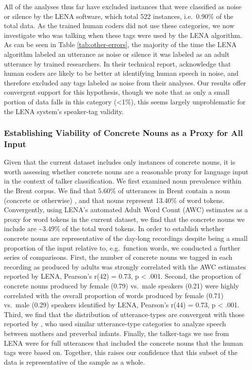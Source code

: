 \documentclass[man,floatsintext]{apa6}
\theoremstyle{definition}
\theoremstyle{definition}
\theoremstyle{definition}
\theoremstyle{remark}
\begin{document}
All of the analyses thus far have excluded instances that were
classified as noise or silence by the LENA software, which total 522
instances, i.e.~0.90\% of the total data. As the trained human coders
did not use these categories, we now investigate who was talking when
these tags were used by the LENA algorithm. As can be seen in Table
\ref{tab:other-errors}, the majority of the time the LENA algorithm
labeled an utterance as noise or silence it was labeled as an adult
utterance by trained researchers. In their technical report,
\citet{Xu2009} acknowledge that human coders are likely to be better at
identifying human speech in noise, and therefore excluded any tags
labeled as noise from their analyses. Our results offer convergent
support for this hypothesis, though we note that as only a small portion
of data falls in this category (\textless1\%), this seems largely
unproblematic for the LENA system's speaker-tag validity.

\hypertarget{establishing-viability-of-concrete-nouns-as-a-proxy-for-all-input}{%
\subsubsection{Establishing Viability of Concrete Nouns as a Proxy for
All
Input}\label{establishing-viability-of-concrete-nouns-as-a-proxy-for-all-input}}

Given that the current dataset includes only instances of concrete
nouns, it is worth assessing whether concrete nouns are a reasonable
proxy for language input in the context of talker classification. We
first examined noun prevalence within the Brent corpus. We find that
5.60\% of utterances in Brent contain a noun (concrete or otherwise)
\citep{Sanchez2019, Brent2001}, and that nouns represent 13.40\% of word
tokens. Convergently, using LENA's automated Adult Word Count (AWC)
estimates as a proxy for word tokens in the current dataset, we find
that the concrete nouns we include are \textasciitilde3.49\% of the
total word tokens. In order to establish whether concrete nouns are
representative of the day-long recordings despite being a small
proportion of the input relative to, e.g.~function words, we conducted a
further series of comparisons. First, the number of concrete nouns we
tagged in each recording as produced by adults was strongly correlated
with the AWC estimates reported by LENA, Pearson's r(42) = 0.73, p
\textless{} .001. Second, the proportion of concrete nouns produced by
female (0.79) vs.~male speakers (0.21) were highly correlated with the
overall proportion of words produced by female (0.71) vs.~male (0.29)
speakers identified by LENA, Pearson's r(44) = 0.73, p \textless{} .001.
Third, we find that the distribution of utterance-types are convergent
with those reported by \citet{Soderstrom2008}, who used similar
utterance-type categories to analyze speech between mothers and
preverbal infants. Finally, the talker-tags we use from LENA were for
full utterances that included the concrete nouns that the human tags
were based on. Together, this raises our confidence that this subset of
the data is representative of the sample as a whole.
\end{document}
